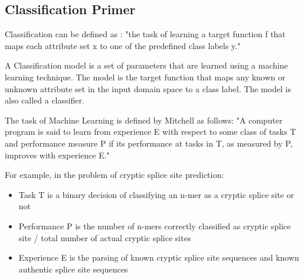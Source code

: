 	
	\subsection{Classification Primer}
	Classification can be defined as : "the task of learning a target function f that maps each attribute set x to one of the predefined class labels y." \cite{pangning} \par
	A Classification model is a set of parameters that are learned using a machine learning technique. The model is the target function that maps any known or unknown attribute set in the input domain space to a class label. The model is also called a classifier. \par
	The task of Machine Learning is defined by Mitchell as follows: "A computer program is said to learn from experience E with respect to some class of tasks T and performance measure P if its performance at tasks in T, as measured by P, improves with experience E." \par

	For example, in the problem of cryptic splice site prediction:
	\begin{itemize}
	\item Task T is a binary decision of classifying an n-mer as a cryptic splice site or not
	\item Performance P is the number of n-mers correctly classified as cryptic splice site / total number of actual cryptic splice sites
	\item Experience E is the parsing of known cryptic splice site sequences and known authentic splice site sequences
    \end{itemize}

